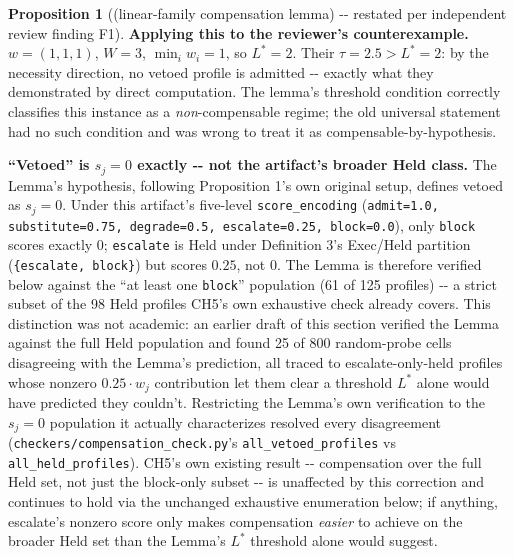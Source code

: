 \documentclass[11pt,a4paper]{article}
\theoremstyle{definition}
\newtheorem{proposition}{Proposition}
\begin{document}
\begin{proposition}[(linear-family compensation lemma) -{}- restated per independent review finding F1]
\noindent\textbf{Applying this to the reviewer's counterexample.} $w = (1,1,1)$, $W = 3$, $\min_i w_i = 1$, so $L^* = 2$. Their $\tau = 2.5 > L^* = 2$: by the necessity direction, no vetoed profile is admitted -{}- exactly what they demonstrated by direct computation. The lemma's threshold condition correctly classifies this instance as a \textit{non}-compensable regime; the old universal statement had no such condition and was wrong to treat it as compensable-by-hypothesis.

\noindent\textbf{``Vetoed'' is $s_j = 0$ exactly -{}- not the artifact's broader Held class.} The Lemma's hypothesis, following Proposition 1's own original setup, defines vetoed as $s_j = 0$. Under this artifact's five-level \texttt{score\_encoding} (\texttt{admit=1.0, substitute=0.75, degrade=0.5, escalate=0.25, block=0.0}), only \texttt{block} scores exactly $0$; \texttt{escalate} is Held under Definition 3's Exec/Held partition (\texttt{\{escalate, block\}}) but scores $0.25$, not $0$. The Lemma is therefore verified below against the ``at least one \texttt{block}'' population (61 of 125 profiles) -{}- a strict subset of the 98 Held profiles CH5's own exhaustive check already covers. This distinction was not academic: an earlier draft of this section verified the Lemma against the full Held population and found 25 of 800 random-probe cells disagreeing with the Lemma's prediction, all traced to escalate-only-held profiles whose nonzero $0.25 \cdot w_j$ contribution let them clear a threshold $L^*$ alone would have predicted they couldn't. Restricting the Lemma's own verification to the $s_j = 0$ population it actually characterizes resolved every disagreement (\texttt{checkers/compensation\_check.py}'s \texttt{all\_vetoed\_profiles} vs \texttt{all\_held\_profiles}). CH5's own existing result -{}- compensation over the full Held set, not just the block-only subset -{}- is unaffected by this correction and continues to hold via the unchanged exhaustive enumeration below; if anything, escalate's nonzero score only makes compensation \textit{easier} to achieve on the broader Held set than the Lemma's $L^*$ threshold alone would suggest.


\end{proposition}
\end{document}
